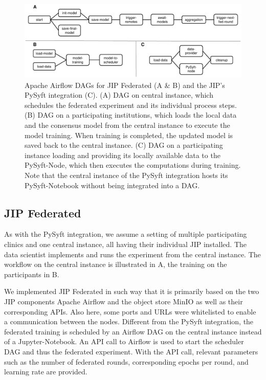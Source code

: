 \begin{figure}[htbp!]
    \centerline{\includegraphics[width=1\textwidth]{1_Figures/dags.pdf}}
    \caption{Apache Airflow DAGs for JIP Federated (A \& B) and the JIP's PySyft integration (C). (A) DAG on central instance, which schedules the federated experiment and its individual process steps. (B) DAG on a participating institutions, which loads the local data and the consensus model from the central instance to execute the model training. When training is completed, the updated model is saved back to the central instance.  (C) DAG on a participating instance loading and providing its locally available data to the PySyft-Node, which then executes the computations during training. Note that the central instance of the PySyft integration hosts its PySyft-Notebook without being integrated into a DAG.}
\label{fig:Dags}
\end{figure}



\subsection{JIP Federated}
\label{subsec:MethodsJIPFederated}

As with the PySyft integration, we assume a setting of multiple participating clinics and one central instance, all having their individual JIP installed. The data scientist implements and runs the experiment from the central instance.
The workflow on the central instance is illustrated in  A, the training on the participants in  B.

We implemented JIP Federated in such way that it is primarily based on the two JIP components Apache Airflow and the object store MinIO as well as their corresponding APIs. Also here, some ports and URLs were whitelisted to enable a communication between the nodes. Different from the PySyft integration, the federated training is scheduled by an Airflow DAG on the central instance instead of a Jupyter-Notebook. An API call to Airflow is used to start the scheduler DAG and thus the federated experiment. With the API call, relevant parameters such as the number of federated rounds, corresponding epochs per round, and learning rate are provided.

